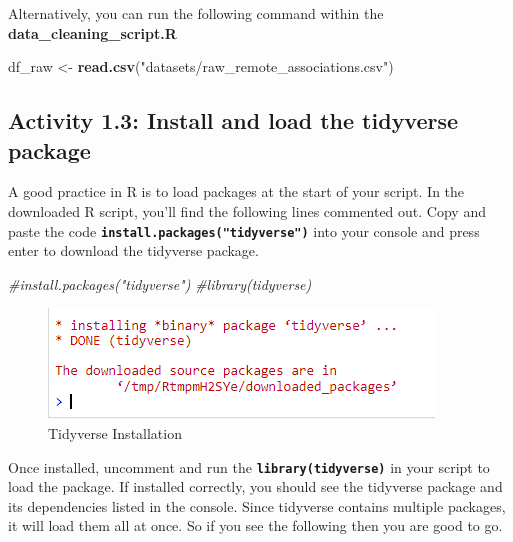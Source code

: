 \documentclass[
]{book}
\newenvironment{Shaded}{\begin{snugshade}}{\end{snugshade}}
\newcommand{\CommentTok}[1]{\textcolor[rgb]{0.56,0.35,0.01}{\textit{#1}}}
\newcommand{\FunctionTok}[1]{\textcolor[rgb]{0.13,0.29,0.53}{\textbf{#1}}}
\newcommand{\NormalTok}[1]{#1}
\newcommand{\OtherTok}[1]{\textcolor[rgb]{0.56,0.35,0.01}{#1}}
\newcommand{\StringTok}[1]{\textcolor[rgb]{0.31,0.60,0.02}{#1}}
\begin{document}
Alternatively, you can run the following command within the \textbf{data\_cleaning\_script.R}

\begin{Shaded}
\begin{Highlighting}[]
\NormalTok{df\_raw }\OtherTok{\textless{}{-}} \FunctionTok{read.csv}\NormalTok{(}\StringTok{"datasets/raw\_remote\_associations.csv"}\NormalTok{) }
\end{Highlighting}
\end{Shaded}

\hypertarget{activity-1.3-install-and-load-the-tidyverse-package}{%
\subsection{Activity 1.3: Install and load the tidyverse package}\label{activity-1.3-install-and-load-the-tidyverse-package}}

A good practice in R is to load packages at the start of your script. In the downloaded R script, you'll find the following lines commented out. Copy and paste the code \textbf{\texttt{install.packages("tidyverse")}} into your console and press enter to download the tidyverse package.

\begin{Shaded}
\begin{Highlighting}[]
\CommentTok{\#install.packages("tidyverse")}
\CommentTok{\#library(tidyverse)}
\end{Highlighting}
\end{Shaded}

\begin{figure}
\centering
\includegraphics{img/05-tidyverse-install.PNG}
\caption{\label{fig:unnamed-chunk-175}Tidyverse Installation}
\end{figure}

Once installed, uncomment and run the \textbf{\texttt{library(tidyverse)}} in your script to load the package. If installed correctly, you should see the tidyverse package and its dependencies listed in the console. Since tidyverse contains multiple packages, it will load them all at once. So if you see the following then you are good to go.
\end{document}

